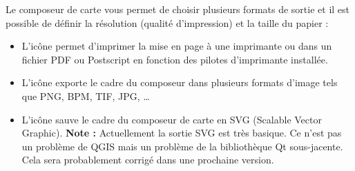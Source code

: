 Le composeur de carte vous permet de choisir plusieurs formats de sortie et il
est possible de d\'efinir la r\'esolution (qualit\'e d'impression) et la taille du
papier :

\begin{itemize}
\item L'ic\^one   permet d'imprimer la
mise en page \`a une imprimante ou dans un fichier PDF ou Postscript en fonction
des pilotes d'imprimante install\'ee.
\item L'ic\^one 
exporte le cadre du composeur dans plusieurs formats d'image tels que PNG, BPM,
TIF, JPG, \dots
\item L'ic\^one  sauve le
cadre du composeur de carte en SVG (Scalable Vector Graphic). \textbf{Note :}
Actuellement la sortie SVG est tr\`es basique. Ce n'est pas un probl\`eme de QGIS
mais un probl\`eme de la biblioth\`eque Qt sous-jacente. Cela sera
probablement corrig\'e dans une prochaine version.
\end{itemize}
